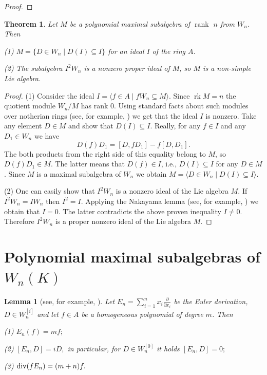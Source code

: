 \documentclass[12pt,a4paper]{amsart}
\theoremstyle{plain}
\newtheorem{theorem}{Theorem}
\newtheorem{lemma}{Lemma}
\theoremstyle{definition}
\begin{document}
{\begin{proof}
	\end{proof}
	
	\begin{theorem}\label{th3a}
		Let $M$ be a polynomial maximal  subalgebra of $\operatorname{rank}$ $n$ from $W_n$. Then 
		
		(1)	$ 	M = \{ D \in W_n \mid D(I) \subseteq I \} $
		for an ideal $I$ of the ring $A$.
		
		(2) The subalgebra $I^2W_n$ is a nonzero proper ideal of $M$, so $M$ is a non-simple Lie algebra. 
	\end{theorem}
	\begin{proof}
		(1) Consider the ideal 		$	I = \langle f \in A \mid fW_n \subseteq M \rangle.	$
		Since $\operatorname{rk} M = n$  the quotient module $W_n/M$ has rank $0$. Using standard facts   about such modules over notherian rings (see, for example, \cite{Matsumura}) we get that the ideal $I$ is nonzero. Take any element $D \in M$ and show that $D(I) \subseteq I$. Really, for any $f \in I$ and any $D_1 \in W_n$ we have
		$$
		D(f)D_1 = [D, fD_1] - f[D, D_1].
		$$
		The both products from the right side of this equality belong to $M$, so $D(f)D_1 \in M$. The latter means that $D(f) \in I$, i.e., $D(I) \subseteq I$ for any $D \in M$. Since $M$ is a maximal subalgebra of $W_n$ we obtain
		$ M = \langle D \in W_n \mid D(I) \subseteq I \rangle .$
		
		(2) One can easily show that $I^2W_n$ is a nonzero ideal of the Lie algebra $M.$ If $I^2W_n=IW_n $ then $I^2=I.$ Applying the Nakayama lemma (see, for example, \cite{Matsumura}) we obtain that $I=0.$ The latter contradicts the above proven inequality $I\not =0.$ Therefore $I^2W_n$ is a proper nonzero ideal of the Lie algebra $M.$ 
	\end{proof}
	\section{Polynomial  maximal subalgebras of  $W_n(K)$}
	\begin{lemma}[see, for example,  \cite{Now}] \label{lm:Euler}
		Let $E_n = \sum_{i=1}^n x_i \frac{\partial}{\partial x_i}$ be the Euler derivation,
		$D \in W^{[i]}_n$ and let $f \in A$ be a homogeneous polynomial of degree $m$.
		Then
		
		(1) $E_n(f) = mf;$
		
		(2) $ [E_n, D] = iD,$
		in particular, for $D \in W^{[0]}_n$ it holds $[E_n, D] = 0;$
		
		(3)  ${\rm div}(f E_n) = (m+n)f.$
		

\end{lemma}}
\end{document}

